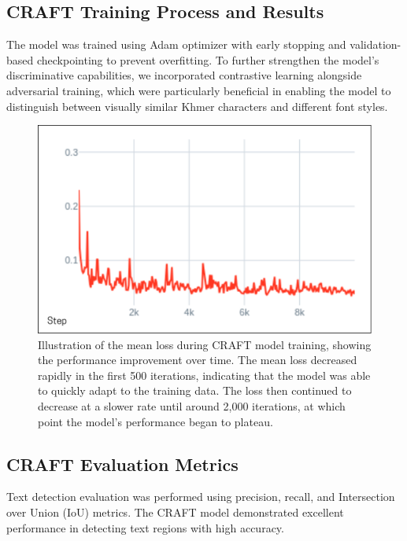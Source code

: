 \subsection{CRAFT Training Process and Results}
\label{subsec:craft-training-results}

The model was trained using Adam optimizer with early stopping and validation-based checkpointing to prevent overfitting. To further strengthen the model's discriminative capabilities, we incorporated contrastive learning alongside adversarial training, which were particularly beneficial in enabling the model to distinguish between visually similar Khmer characters and different font styles.

\begin{figure}[H]
    \centering
    \includegraphics[width=\textwidth]{figures/mean_loss_craft.png}
    \caption{Illustration of the mean loss during CRAFT model training, showing the performance 
    improvement over time. The mean loss decreased rapidly in the first 500 iterations, 
    indicating that the model was able to quickly adapt to the training data. The loss then 
    continued to decrease at a slower rate until around 2,000 iterations, at which point 
    the model's performance began to plateau.}
    \label{fig:mean-loss-craft}
\end{figure}

\subsection{CRAFT Evaluation Metrics}
\label{subsec:craft-evaluation}

Text detection evaluation was performed using precision, recall, and Intersection over Union (IoU) metrics. The CRAFT model demonstrated excellent performance in detecting text regions with high accuracy.

